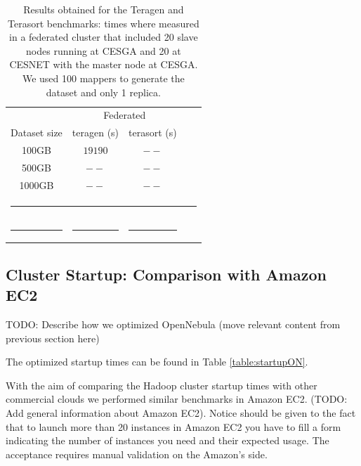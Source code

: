 \documentclass[oribibl]{llncs_Ibergrid2013}
\begin{document}
\begin{table}[h!]
\caption{Results obtained for the Teragen and Terasort benchmarks: times where measured in a federated cluster that included 20 slave nodes running at CESGA and 20 at CESNET with the master node at CESGA. We used 100 mappers to generate the dataset and only 1 replica. }
\label{table:teragen}
%
\vspace{-0.5em}
%
\begin{center}
\begin{tabular}{ccccc}
\toprule
    					& \multicolumn{2}{c}{Federated} 	  \\
Dataset size				& teragen (s)		& terasort (s) 	  \\
\midrule
100GB                			& $19190$		& $--$     \\
500GB                			& $--$	 		& $--$      \\
1000GB                			& $--$			& $--$      \\
%
\bottomrule
\multicolumn{5}{c}{\rule{0.98\textwidth}{0em}}\\
\rule{0.2\textwidth}{0cm} & \rule{0.2\textwidth}{0cm} & \rule{0.2\textwidth}{0cm} &  \rule{0.2\textwidth}{0cm} & \\
\end{tabular}
\end{center}
\end{table}


\subsection{Cluster Startup: Comparison with Amazon EC2}
\label{sect-startup}
TODO: Describe how we optimized OpenNebula (move relevant content from previous section here)

The optimized startup times can be found in Table \ref{table:startupON}.

With the aim of comparing the Hadoop cluster startup times with other commercial clouds we performed similar benchmarks in Amazon EC2. (TODO: Add general information about Amazon EC2). Notice should be given to the fact that to launch more than 20 instances in Amazon EC2 you have to fill a form indicating the number of instances you need and their expected usage. The acceptance requires manual validation on the Amazon's side.
\end{document}
